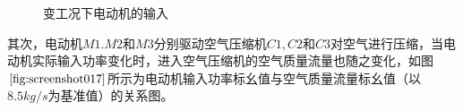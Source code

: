 \documentclass{jnuthesis}
\begin{document}
	\begin{figure}[h]
		\caption{\fontsize{10.5bp}{10pt}变工况下电动机的输入} %
		\label{fig:7}  %
	\end{figure}
	
	\par 其次，电动机$ M1.M2 $和$ M3 $分别驱动空气压缩机$ C1,C2 $和$ C3 $对空气进行压缩，当电动机实际输入功率变化时，进入空气压缩机的空气质量流量也随之变化，如图$ \fontsize{10.5bp}{10pt}\ref{fig:screenshot017} $所示为电动机输入功率标幺值与空气质量流量标幺值（以$ 8.5kg/s $为基准值）的关系图。
	
\end{document}

